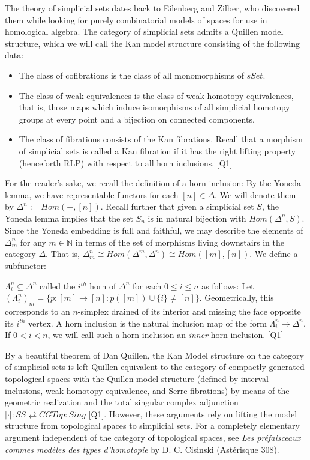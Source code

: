 \documentclass{amsart}
\begin{document}
The theory of simplicial sets dates back to Eilenberg and Zilber, who discovered them while looking for purely combinatorial models of spaces for use in homological algebra.  The category of simplicial sets admits a Quillen model structure, which we will call the Kan model structure consisting of the following data:

\begin{itemize}
\item The class of cofibrations is the class of all monomorphisms of $sSet$.
\item The class of weak equivalences is the class of weak homotopy equivalences, that is, those maps which induce isomorphisms of all simplicial homotopy groups at every point and a bijection on connected components.
\item The class of fibrations consists of the Kan fibrations.  Recall that a morphism of simplicial sets is called a Kan fibration if it has the right lifting property (henceforth RLP) with respect to all horn inclusions. [Q1]
\end{itemize}

For the reader's sake, we recall the definition of a horn inclusion: By the Yoneda lemma, we have representable functors for each $[n]\in \Delta$.  We will denote them by $\Delta^n:=Hom(-,[n])$.  Recall further that given a simplicial set $S$, the Yoneda lemma implies that the set $S_n$ is in natural bijection with $Hom(\Delta^n,S)$.   Since the Yoneda embedding is full and faithful, we may describe the elements of $\Delta^n_m$ for any $m\in \mathbb{N}$ in terms of the set of morphisms living downstairs in the category $\Delta$.  That is, $\Delta^n_m\cong Hom(\Delta^m,\Delta^n)\cong Hom([m],[n])$.  We define a subfunctor:

\begin{defn} $\Lambda^n_i\subseteq \Delta^n$ called the $i^{th}$ horn of $\Delta^n$ for each $0\leq i\leq n$ as follows: Let $(\Lambda^n_i)_m=\{p:[m]\to [n]:p([m])\cup\{i\}\neq [n]\}$.  Geometrically, this corresponds to an $n$-simplex drained of its interior and missing the face opposite its $i^{th}$ vertex.  A horn inclusion is the natural inclusion map of the form $\Lambda^n_i\to \Delta^n$.  If $0<i<n$, we will call such a horn inclusion an \emph{inner} horn inclusion. [Q1] 
\end{defn}

By a beautiful theorem of Dan Quillen, the Kan Model structure on the category of simplicial sets is left-Quillen equivalent to the category of compactly-generated topological spaces with the Quillen model structure (defined by interval inclusions, weak homotopy equivalence, and Serre fibrations) by means of the geometric realization and the total singular complex adjunction $|\cdot|:SS\rightleftarrows CGTop: Sing$ [Q1].  However, these arguments rely on lifting the model structure from topological spaces to simplicial sets.  For a completely elementary argument independent of the category of topological spaces, see \emph{Les pr\'efaisceaux commes mod\`eles des types d'homotopie} by D. C. Cisinski (Ast\'erisque 308). 
\end{document}
